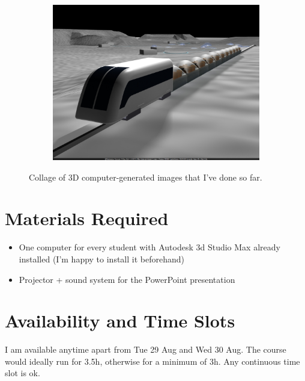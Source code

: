 \documentclass[11pt,a4paper]{article}
\begin{document}
\begin{figure}[H]
\begin{subfigure}{0.32\textwidth}
  \includegraphics[width=\textwidth]{images/tranvai+baza-vray01.jpg}
 \end{subfigure}
 
 
 
 \caption{Collage of 3D computer-generated images that I've done so far.}
 \label{fig:persPort}
\end{figure}

\section{Materials Required}

\begin{itemize}
 \item One computer for every student with Autodesk 3d Studio Max already installed (I'm happy to install it beforehand)
 \item Projector + sound system for the PowerPoint presentation
\end{itemize}



\section{Availability and Time Slots}

I am available anytime apart from Tue 29 Aug and Wed 30 Aug. The course would ideally run for 3.5h, otherwise for a minimum of 3h. Any continuous time slot is ok.
\end{document}
